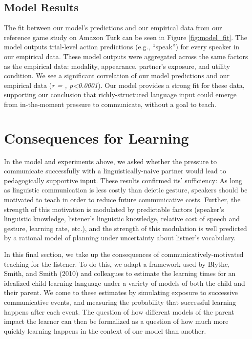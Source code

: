 \documentclass[english,,man,floatsintext]{apa6}
\begin{document}
\hypertarget{model-results}{%
\subsection{Model Results}\label{model-results}}

The fit between our model's predictions and our empirical data from our reference game study on Amazon Turk can be seen in Figure \ref{fig:model_fit}. The model outputs trial-level action predictions (e.g., \enquote{speak}) for every speaker in our empirical data. These model outputs were aggregated across the same factors as the empirical data: modality, appearance, partner's exposure, and utility condition. We see a significant correlation of our model predictions and our empirical data (\emph{r = , p\textless{}0.0001}). Our model provides a strong fit for these data, supporting our conclusion that richly-structured language input could emerge from in-the-moment pressure to communicate, without a goal to teach.

\hypertarget{consequences-for-learning}{%
\section{Consequences for Learning}\label{consequences-for-learning}}

In the model and experiments above, we asked whether the pressure to communicate successfully with a linguistically-naive partner would lead to pedagogically supportive input. These results confirmed its' sufficiency: As long as linguistic communication is less costly than deictic gesture, speakers should be motivated to teach in order to reduce future communicative costs. Further, the strength of this motivation is modulated by predictable factors (speaker's linguistic knowledge, listener's linguistic knowledge, relative cost of speech and gesture, learning rate, etc.), and the strength of this modulation is well predicted by a rational model of planning under uncertainty about listner's vocabulary.

In this final section, we take up the consequences of communicatively-motivated teaching for the listener. To do this, we adapt a framework used by Blythe, Smith, and Smith (2010) and colleagues to estimate the learning times for an idealized child learning language under a variety of models of both the child and their parent. We come to these estimates by simulating exposure to successive communicative events, and measuring the probability that successful learning happens after each event. The question of how different models of the parent impact the learner can then be formalized as a question of how much more quickly learning happens in the context of one model than another.
\end{document}
